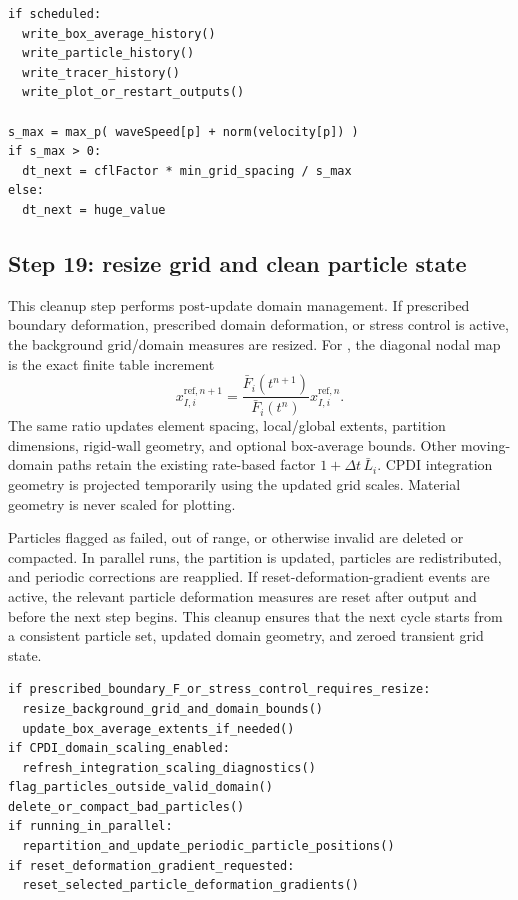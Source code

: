 \begin{lstlisting}[caption={Output and stable time step.},basicstyle=\ttfamily\small]
if scheduled:
  write_box_average_history()
  write_particle_history()
  write_tracer_history()
  write_plot_or_restart_outputs()

s_max = max_p( waveSpeed[p] + norm(velocity[p]) )
if s_max > 0:
  dt_next = cflFactor * min_grid_spacing / s_max
else:
  dt_next = huge_value
\end{lstlisting}

\subsection{Step 19: resize grid and clean particle state}
\label{subsec:solver-step-19}
This cleanup step performs post-update domain management.  If prescribed boundary deformation, prescribed domain deformation, or stress control is active, the background grid/domain measures are resized.  For , the diagonal nodal map is the exact finite table increment
\begin{equation}
  x_{I,i}^{\mathrm{ref},n+1}=\frac{\bar F_i(t^{n+1})}{\bar F_i(t^n)}x_{I,i}^{\mathrm{ref},n}.
\end{equation}
The same ratio updates element spacing, local/global extents, partition dimensions, rigid-wall geometry, and optional box-average bounds.  Other moving-domain paths retain the existing rate-based factor $1+\Delta t\,\bar L_i$.  CPDI integration geometry is projected temporarily using the updated grid scales. Material geometry is never scaled for plotting.

Particles flagged as failed, out of range, or otherwise invalid are deleted or compacted.  In parallel runs, the partition is updated, particles are redistributed, and periodic corrections are reapplied.  If reset-deformation-gradient events are active, the relevant particle deformation measures are reset after output and before the next step begins.  This cleanup ensures that the next cycle starts from a consistent particle set, updated domain geometry, and zeroed transient grid state.

\begin{lstlisting}[caption={Grid resize and cleanup.},basicstyle=\ttfamily\small]
if prescribed_boundary_F_or_stress_control_requires_resize:
  resize_background_grid_and_domain_bounds()
  update_box_average_extents_if_needed()
if CPDI_domain_scaling_enabled:
  refresh_integration_scaling_diagnostics()
flag_particles_outside_valid_domain()
delete_or_compact_bad_particles()
if running_in_parallel:
  repartition_and_update_periodic_particle_positions()
if reset_deformation_gradient_requested:
  reset_selected_particle_deformation_gradients()
\end{lstlisting}

